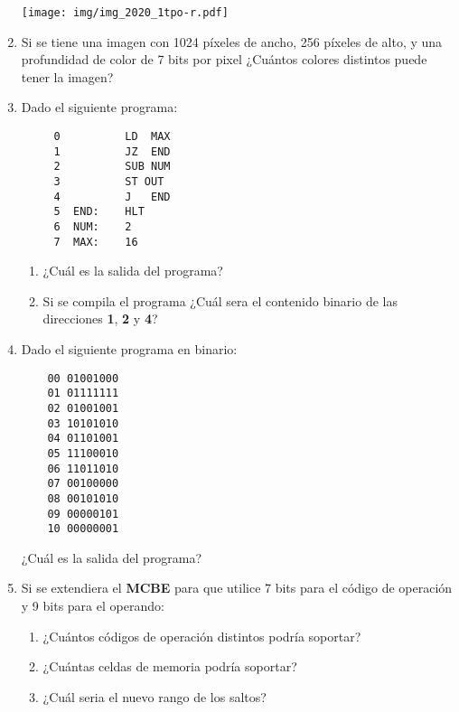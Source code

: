 \documentclass[12pt]{article}
\begin{document}
\begin{enumerate}
    \texttt{[image: img/img\_2020\_1tpo-r.pdf]}

    \item Si se tiene una imagen con 1024 píxeles de ancho, 256 píxeles de
        alto, y una profundidad de color de 7 bits por pixel ¿Cuántos colores
        distintos puede tener la imagen?

    \item Dado el siguiente programa:

        \begin{verbatim}
     0          LD  MAX
     1          JZ  END
     2          SUB NUM
     3          ST OUT
     4          J   END
     5  END:    HLT
     6  NUM:    2
     7  MAX:    16
        \end{verbatim}

        \begin{enumerate}

            \item ¿Cuál es la salida del programa?

            \item Si se compila el programa ¿Cuál sera el contenido binario de
                las direcciones \textbf{1}, \textbf{2} y \textbf{4}?

        \end{enumerate}

    \item Dado el siguiente programa en binario:

        \begin{verbatim}
    00 01001000
    01 01111111
    02 01001001
    03 10101010
    04 01101001
    05 11100010
    06 11011010
    07 00100000
    08 00101010
    09 00000101
    10 00000001
        \end{verbatim}

        ¿Cuál es la salida del programa?

    \item Si se extendiera el \textbf{MCBE} para que utilice 7 bits para el
        código de operación y 9 bits para el operando:

        \begin{enumerate}

            \item ¿Cuántos códigos de operación distintos podría soportar?

            \item ¿Cuántas celdas de memoria podría soportar?

            \item ¿Cuál seria el nuevo rango de los saltos?


\end{enumerate}
\end{enumerate}
\end{document}
